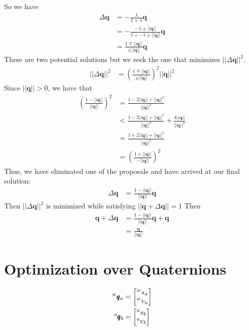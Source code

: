 \documentclass{article}
\begin{document}
So we have
\begin{align*}
    \Delta \pmb{q} &= - \frac{\lambda}{1 + \lambda} \pmb{q} \\
    &= - \frac{-1 \pm || \pmb{q} ||}{1 + -1 \pm || \pmb{q} ||} \pmb{q} \\
    &= \frac{1 \mp || \pmb{q} || }{\pm || \pmb{q} ||} \pmb{q}
\end{align*}
These are two potential solutions but we seek the one that minimizes $|| \Delta \pmb{q} || ^2$.
\begin{align*}
    || \Delta \pmb{q} ||^2 &= \left( \frac{1 \mp || \pmb{q} ||}{\pm || \pmb{q} ||} \right)^2 || \pmb{q} ||^2
\end{align*}
Since $|| \pmb{q} || > 0$, we have that
\begin{align*}
    \left( \frac{1 - ||\pmb{q}|| }{||\pmb{q}||} \right)^2 &= \frac{1 - 2 || \pmb{q} || + ||\pmb{q}||^2}{||\pmb{q}||^2} \\
    &< \frac{1 - 2 || \pmb{q} || + ||\pmb{q}||^2}{||\pmb{q}||^2} + \frac{4 || \pmb{q} ||}{|| \pmb{q} ||^2} \\
    &= \frac{1 + 2 || \pmb{q} || + ||\pmb{q}||^2}{||\pmb{q}||^2} \\
    &= \left( \frac{1 + ||\pmb{q}|| }{-||\pmb{q}||} \right)^2
\end{align*}
Thus, we have eliminated one of the proposals and have arrived at our final solution:
\begin{align}
    \Delta \pmb{q} &= \frac{1 - ||\pmb{q} ||}{|| \pmb{q} ||} \pmb{q}
\end{align}
Then $||\Delta \pmb{q}||^2$ is minimized while satisfying $|| \pmb{q} + \Delta \pmb{q} || = 1$
Then
\begin{align*}
    \pmb{q} + \Delta \pmb{q} &= \frac{1 - ||\pmb{q}||}{||\pmb{q}||} \pmb{q} + \pmb{q} \\
    &= \frac{\pmb{q}}{||\pmb{q}||}
\end{align*}

\section{Optimization over Quaternions}

\begin{align*}
    \prescript{w}{}{\pmb{q}}_{a} &= \begin{bmatrix}
        \prescript{w}{}{s}_a \\
        \prescript{w}{}{v}_a
    \end{bmatrix} \\
    \prescript{a}{}{\pmb{q}}_b &= \begin{bmatrix}
        \prescript{a}{}{s}_b \\
        \prescript{a}{}{v}_b
    \end{bmatrix}
\end{align*}
\end{document}
